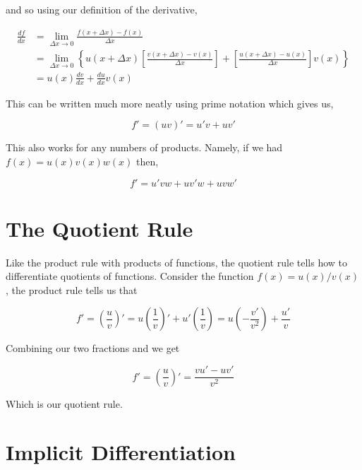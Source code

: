 and so using our definition of the derivative,

\begin{align*}
    \frac{df}{dx} &= \lim_{\Delta x \to 0} \frac{f(x + \Delta x) - f(x)}{\Delta x}\\
    &= \lim_{\Delta x \to 0} \left\{u(x + \Delta x)\left[\frac{v(x + \Delta x) - v(x)}{\Delta x}\right] + \left[\frac{u(x + \Delta x) - u(x)}{\Delta x}\right]v(x)\right\}\\
    &= u(x)\frac{dv}{dx} + \frac{du}{dx}v(x)
\end{align*}

This can be written much more neatly using prime notation which gives us,

\begin{equation*}
    f' = (uv)' = u' v + uv'
\end{equation*}

This also works for any numbers of products. Namely, if we had $f(x) = u(x)v(x)w(x)$ then,

\begin{equation*}
    f' = u'vw + uv'w + uvw'
\end{equation*}

\section{The Quotient Rule}

Like the product rule with products of functions, the quotient rule tells how to differentiate 
quotients of functions. Consider the function $f(x) = u(x)/v(x)$, the product rule tells us that

\begin{equation*}
    f' = \left(\frac{u}{v}\right)' = u\left(\frac{1}{v}\right)' + u'\left(\frac{1}{v}\right) = u\left(-\frac{v'}{v^2}\right) + \frac{u'}{v}
\end{equation*}

Combining our two fractions and we get

\begin{equation*}
    f' = \left(\frac{u}{v}\right)' = \frac{vu' - uv'}{v^2}
\end{equation*}

Which is our quotient rule.

\section{Implicit Differentiation}